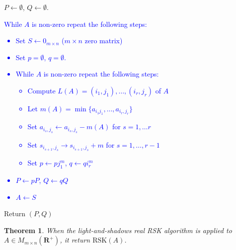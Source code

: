 \documentclass[10pt]{amsproc}
\newtheorem{theorem}{Theorem}[subsection]
\theoremstyle{definition}
\theoremstyle{remark}
\newcommand{\rp}{\mathbf{R}^+}
\newcommand{\rsk}{\mathrm{RSK}}
\newcommand{\ot}{\leftarrow}
\begin{document}
\begin{itemize}
\item $P\ot \emptyset$, $Q\ot\emptyset$.
  \textcolor{blue}{
  \item While $A$ is non-zero repeat the following steps:
    \begin{itemize}
    \item Set $S\ot 0_{m\times n}$ ($m\times n$ zero matrix)
    \item Set $p=\emptyset$, $q=\emptyset$.
    \item While $A$ is non-zero repeat the following steps:
      \begin{itemize}
      \item Compute $L(A) = (i_1,j_1),\dotsc,(i_r,j_r)$ of $A$
      \item Let $m(A)=\min\{a_{i_1j_1},\dotsc,a_{i_r,j_r}\}$
      \item Set $a_{i_s,j_s}\ot a_{i_s,j_s}-m(A)$ for $s=1,\dotsc r$
      \item Set $s_{i_{s+1},j_s}\to s_{i_{s+1},j_s}+m$ for $s=1,\dotsc,r-1$
      \item Set $p\ot pj_1^m$, $q\ot qi_r^m$
      \end{itemize}
    \item $P\ot pP$, $Q\ot qQ$
    \item $A\ot S$
    \end{itemize}
  }
\item Return $(P, Q)$
\end{itemize}
\begin{theorem}
  When the light-and-shadows real RSK algorithm is applied to $A\in M_{m\times n}(\rp)$, it return $\rsk(A)$.
\end{theorem}
\end{document}
